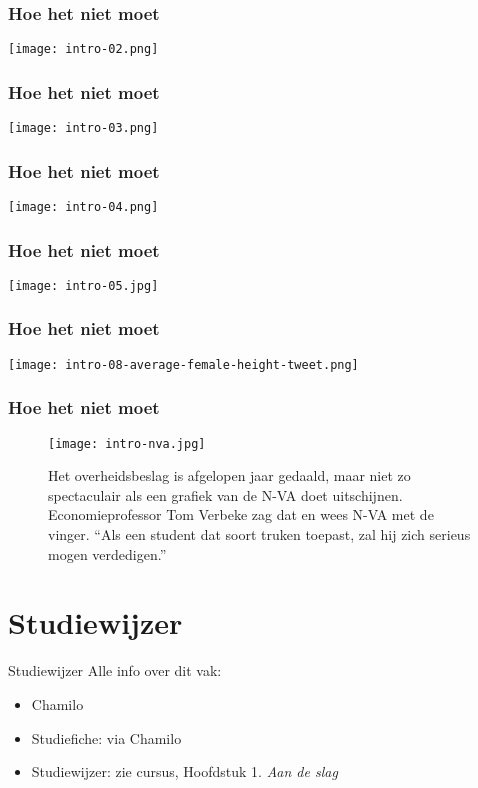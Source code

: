 \documentclass[aspectratio=169]{beamer}
\begin{document}
\begin{frame}
  \frametitle{Hoe het niet moet}
  
  \centering
  \texttt{[image: intro-02.png]}
\end{frame}

\begin{frame}
  \frametitle{Hoe het niet moet}
  
  \centering
  \texttt{[image: intro-03.png]}
\end{frame}

\begin{frame}
  \frametitle{Hoe het niet moet}
  
  \centering
  \texttt{[image: intro-04.png]}
\end{frame}

\begin{frame}
  \frametitle{Hoe het niet moet}
  
  \centering
  \texttt{[image: intro-05.jpg]}
\end{frame}

\begin{frame}
  \frametitle{Hoe het niet moet}
  
  \centering
  \texttt{[image: intro-08-average-female-height-tweet.png]}
\end{frame}

\begin{frame}
  \frametitle{Hoe het niet moet}
  
  \begin{figure}
    \texttt{[image: intro-nva.jpg]}
    \caption{Het overheidsbeslag is afgelopen jaar gedaald, maar niet zo spectaculair als een grafiek van de N-VA doet uitschijnen. Economieprofessor Tom Verbeke zag dat en wees N-VA met de vinger. ``Als een student dat soort truken toepast, zal hij zich serieus mogen verdedigen.''}
  \end{figure}
  
\end{frame}

\section{Studiewijzer}

\begin{frame}{Studiewijzer}
  Alle info over dit vak:
  
  \begin{itemize}
    \item Chamilo
    \item Studiefiche: via Chamilo
    \item Studiewijzer: zie cursus, Hoofdstuk 1. \textit{Aan de slag}
  \end{itemize}
\end{frame}
\end{document}

